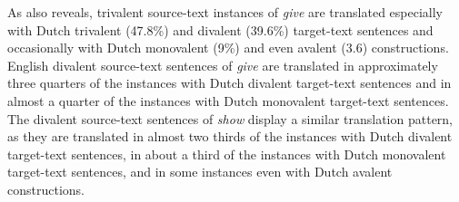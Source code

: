 \documentclass[output=paper]{LSP/langsci}
\begin{document}
\begin{table}
     \centering
 
     \caption{Valency reduction in Dutch translations}
     \label{tab:5.5}
 
   \end{table}

As  also reveals, trivalent source-text instances of \textit{give} are translated especially with Dutch trivalent (47.8\%) and divalent (39.6\%) target-text sentences and occasionally with Dutch monovalent (9\%) and even avalent (3.6) constructions. English divalent source-text sentences of \textit{give} are translated in approximately three quarters of the instances with Dutch divalent target-text sentences and in almost a quarter of the instances with Dutch monovalent target-text sentences. The divalent source-text sentences of \textit{show} display a similar translation pattern, as they are translated in almost two thirds of the instances with Dutch divalent target-text sentences, in about a third of the instances with Dutch monovalent target-text sentences, and in some instances even with Dutch avalent constructions.
\end{document}
